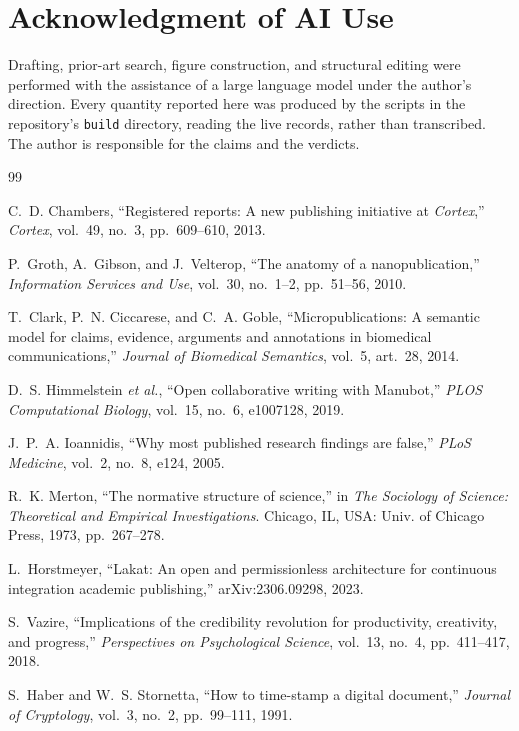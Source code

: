 \documentclass[journal]{IEEEtran}
\begin{document}
\section*{Acknowledgment of AI Use}

Drafting, prior-art search, figure construction, and structural editing were
performed with the assistance of a large language model under the author's
direction. Every quantity reported here was produced by the scripts in the
repository's \texttt{build} directory, reading the live records, rather than
transcribed. The author is responsible for the claims and the verdicts.

\begin{thebibliography}{99}
\footnotesize

C.~D. Chambers, ``Registered reports: A new publishing initiative at
\emph{Cortex},'' \emph{Cortex}, vol.~49, no.~3, pp.~609--610, 2013.

P.~Groth, A.~Gibson, and J.~Velterop, ``The anatomy of a nanopublication,''
\emph{Information Services and Use}, vol.~30, no.~1--2, pp.~51--56, 2010.

T.~Clark, P.~N. Ciccarese, and C.~A. Goble, ``Micropublications: A semantic model
for claims, evidence, arguments and annotations in biomedical communications,''
\emph{Journal of Biomedical Semantics}, vol.~5, art.~28, 2014.

D.~S. Himmelstein \emph{et al.}, ``Open collaborative writing with Manubot,''
\emph{PLOS Computational Biology}, vol.~15, no.~6, e1007128, 2019.

J.~P.~A. Ioannidis, ``Why most published research findings are false,''
\emph{PLoS Medicine}, vol.~2, no.~8, e124, 2005.

R.~K. Merton, ``The normative structure of science,'' in \emph{The Sociology of
Science: Theoretical and Empirical Investigations}. Chicago, IL, USA: Univ. of
Chicago Press, 1973, pp.~267--278. %

L.~Horstmeyer, ``Lakat: An open and permissionless architecture for continuous
integration academic publishing,'' arXiv:2306.09298, 2023.

S.~Vazire, ``Implications of the credibility revolution for productivity,
creativity, and progress,'' \emph{Perspectives on Psychological Science},
vol.~13, no.~4, pp.~411--417, 2018.

S.~Haber and W.~S. Stornetta, ``How to time-stamp a digital document,''
\emph{Journal of Cryptology}, vol.~3, no.~2, pp.~99--111, 1991.


\end{thebibliography}
\end{document}
